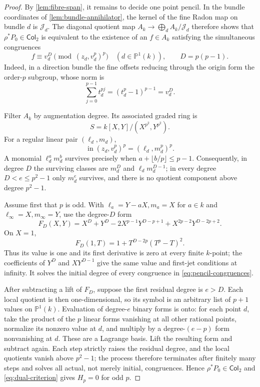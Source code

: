 \documentclass[12pt,a4paper]{article}
\theoremstyle{definition}
\begin{document}
\begin{proof}
By \cref{lem:fibre-span}, it remains to decide one point pencil.  In the
bundle coordinates of \cref{lem:bundle-annihilator}, the kernel of the fine
Radon map on bundle $d$ is $\mathcal J_d$.  The diagonal quotient map
$A_k\to\bigoplus_d A_k/\mathcal J_d$ therefore shows that
$\rho^*P_0\in\mathsf{Col}_2$ is equivalent to the existence of an
$f\in A_k$ satisfying the simultaneous congruences
\begin{equation}\label{eq:pencil-congruences}
 f\equiv v_d^D\pmod{(z_d,v_d^p)^p}
 \quad(d\in\mathbb P^1(k)),\qquad D=p(p-1).
\end{equation}
Indeed, in a direction bundle the fine offsets reducing through the origin
form the order-$p$ subgroup, whose norm is
\[
 \sum_{j=0}^{p-1}t_d^{pj}=(t_d^p-1)^{p-1}=v_d^D.
\]

Filter $A_k$ by augmentation degree.  Its associated graded ring is
\[
 S=k[X,Y]/(X^{p^2},Y^{p^2}).
\]
For a regular linear pair $(\ell_d,m_d)$,
\[
 \operatorname{in}(z_d,v_d^p)^p=(\ell_d,m_d^p)^p.
\]
A monomial $\ell_d^am_d^b$ survives precisely when
$a+\lfloor b/p\rfloor\leq p-1$.  Consequently, in degree $D$ the surviving
classes are $m_d^D$ and $\ell_dm_d^{D-1}$; in every degree
$D<e\leq p^2-1$ only $m_d^e$ survives, and there is no quotient component
above degree $p^2-1$.

Assume first that $p$ is odd.  With
$\ell_a=Y-aX,m_a=X$ for $a\in k$ and
$\ell_\infty=X,m_\infty=Y$, use the degree-$D$ form
\[
 F_D(X,Y)=X^D+Y^D-2X^{p-1}Y^{D-p+1}
              +X^{2p-2}Y^{D-2p+2}.
\]
On $X=1$,
\[
 F_D(1,T)=1+T^{D-2p}(T^p-T)^2.
\]
Thus its value is one and its first derivative is zero at every finite
$k$-point; the coefficients of $Y^D$ and $XY^{D-1}$ give the same value and
first-jet conditions at infinity.  It solves the initial degree of every
congruence in \eqref{eq:pencil-congruences}.

After subtracting a lift of $F_D$, suppose the first residual degree is
$e>D$.  Each local quotient is then one-dimensional, so its symbol is an
arbitrary list of $p+1$ values on $\mathbb P^1(k)$.  Evaluation of degree-$e$
binary forms is onto: for each point $d$, take the product of the $p$ linear
forms vanishing at all other rational points, normalize its nonzero value at
$d$, and multiply by a degree-$(e-p)$ form nonvanishing at $d$.  These are a
Lagrange basis.  Lift the resulting form and subtract again.  Each step
strictly raises the residual degree, and the local quotients vanish above
$p^2-1$; the process therefore terminates after finitely many steps and
solves all actual, not merely initial, congruences.  Hence
$\rho^*P_0\in\mathsf{Col}_2$ and
\eqref{eq:dual-criterion} gives $H_p=0$ for odd $p$.


\end{proof}
\end{document}
